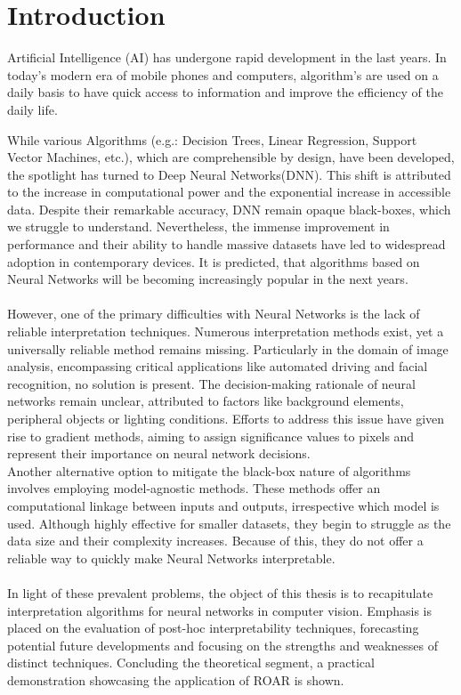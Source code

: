 
\chapter{Introduction}

Artificial Intelligence (AI) has undergone rapid development in the last years. In today's modern era of mobile phones and computers, algorithm's are used on a daily basis to have quick access to information and improve the efficiency of the daily life.

While various Algorithms (e.g.: Decision Trees, Linear Regression, Support Vector Machines, etc.), which are comprehensible by design, have been developed, the spotlight has turned to Deep Neural Networks(DNN). This shift is attributed to the increase in computational power and the exponential increase in accessible data. Despite their remarkable accuracy, DNN remain opaque black-boxes, which we  struggle to understand. Nevertheless, the immense improvement in performance and their ability to handle massive datasets have led to widespread adoption in contemporary devices. It is predicted, that algorithms based on Neural Networks will be becoming increasingly popular in the next years.
\\\\
However, one of the primary difficulties with Neural Networks is the lack of reliable interpretation techniques. Numerous interpretation methods exist, yet a universally reliable method remains missing. Particularly in the domain of image analysis, encompassing critical applications like automated driving and facial recognition, no solution is present. The decision-making rationale of neural networks remain unclear, attributed to factors like background elements, peripheral objects or lighting conditions.
Efforts to address this issue have given rise to gradient methods, aiming to assign significance values to pixels and represent their importance on neural network decisions.
\\
Another alternative option to mitigate the black-box nature of  algorithms involves employing model-agnostic methods. These methods offer an computational linkage between inputs and outputs, irrespective which model is used. Although highly effective for smaller datasets, they begin to struggle as the data size and their complexity increases. Because of this, they do not offer a reliable way to quickly make Neural Networks interpretable.
\\\\
In light of these prevalent problems, the object of this thesis is to recapitulate interpretation algorithms for neural networks in computer vision.  Emphasis is placed on the evaluation of post-hoc interpretability techniques, forecasting potential future developments and focusing on the strengths and weaknesses of distinct  techniques. Concluding the theoretical segment, a practical demonstration showcasing the application of ROAR is shown. 






